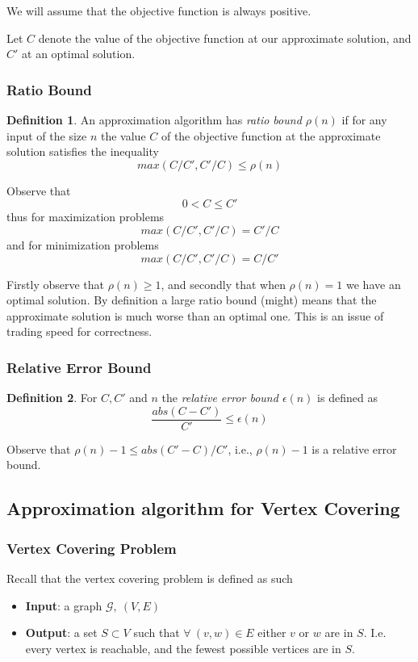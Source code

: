 \documentclass{article}
\theoremstyle{definition}
\newtheorem{definition}{Definition}[section]
\newcommand{\G}{\mathcal{G}}
\begin{document}
We will assume that the objective function is always positive.

Let $C$ denote the value of the objective function at our approximate solution,
and $C\prime$ at an optimal solution.

\subsubsection{Ratio Bound}
\begin{definition}
    An approximation algorithm has \textit{ratio bound $\rho(n)$}
    if for any input of the size $n$ the value $C$ of the objective function
    at the approximate solution satisfies the inequality
    $$
    max(C/C\prime, C\prime/C) \leq \rho(n)
    $$
\end{definition}

Observe that
$$ 0 < C \leq C\prime $$
thus for maximization problems
$$ max(C/C\prime, C\prime/C) = C\prime/C $$
and for minimization problems
$$ max(C/C\prime, C\prime/C) = C/C\prime $$

Firstly observe that $\rho(n) \geq 1$,
and secondly that when $\rho(n) = 1$ we have an optimal solution.
By definition a large ratio bound (might) means that the approximate
solution is much worse than an optimal one.
This is an issue of trading speed for correctness.

\subsubsection{Relative Error Bound}
\begin{definition}
    For $C, C\prime$ and $n$  the \textit{relative error bound $\epsilon(n)$} is defined as
    $$\frac{abs(C - C\prime)}{C\prime} \leq \epsilon(n)$$
\end{definition}

Observe that $\rho(n) - 1 \leq abs(C\prime - C)/C\prime$,
i.e., $\rho(n) - 1$ is a relative error bound.

\subsection{Approximation algorithm for Vertex Covering}
\subsubsection{Vertex Covering Problem}
Recall that the vertex covering problem is defined as such
\begin{itemize}
    \item \textbf{Input}:
        a graph $\G,\ (V,E)$
    \item \textbf{Output}:
        a set $S \subset V$ such that $\forall\ (v,w) \in E$
        either $v$ or $w$ are in $S$.
        I.e. every vertex is reachable,
        and the fewest possible vertices are in $S$.
\end{itemize}
\end{document}
